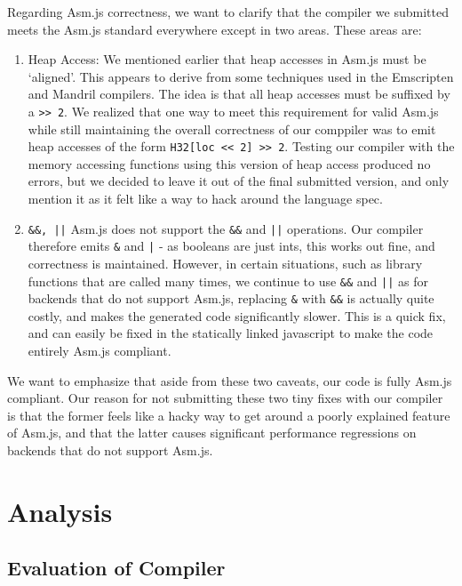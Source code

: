 \documentclass[twoside]{article}
\begin{document}
\begin{multicols}{2}
Regarding Asm.js correctness, we want to clarify that the compiler we submitted
meets the Asm.js standard everywhere except in two areas. These areas are:

\begin{enumerate}
  \item Heap Access: 
    We mentioned earlier that heap accesses in Asm.js must be `aligned'. This
    appears to derive from some techniques used in the Emscripten and Mandril
    compilers. The idea is that all heap accesses must be suffixed by a \texttt{>> 2}.
    We realized that one way to meet this requirement for valid Asm.js while still
    maintaining the overall correctness of our comppiler was to emit heap accesses
    of the form \texttt{H32[loc << 2] >> 2}. Testing our compiler with the memory
    accessing functions using this version of heap access produced no errors, but
    we decided to leave it out of the final submitted version, and only mention it
    as it felt like a way to hack around the language spec. 

  \item \texttt{\&\&, ||}
  Asm.js does not support the \texttt{\&\&} and \texttt{||} operations. Our compiler
  therefore emits \texttt{\&} and \texttt{|} - as booleans are just ints, this 
  works out fine, and correctness is maintained. However, in certain situations, such
  as library functions that are called many times, we continue to use \texttt{\&\&} and
  \texttt{||} as for backends that do not support Asm.js, replacing \texttt{\&} with 
  \texttt{\&\&} is actually quite costly, and makes the generated code significantly slower. 
  This is a quick fix, and can easily be fixed in the statically linked javascript to 
  make the code entirely Asm.js compliant. 
\end{enumerate}
We want to emphasize that aside from these two caveats, our code is fully Asm.js 
compliant. Our reason for not submitting these two tiny fixes with our compiler is
that the former feels like a hacky way to get around a poorly explained feature of
Asm.js, and that the latter causes significant performance regressions on backends
that do not support Asm.js. 



\section{Analysis}

\subsection{Evaluation of Compiler}


\end{multicols}
\end{document}
